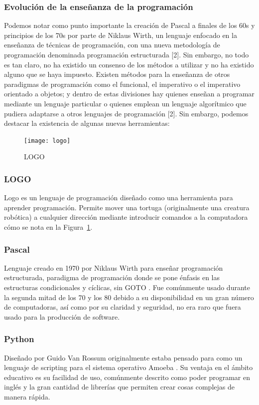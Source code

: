 \subsubsection{Evolución de la enseñanza de la programación}
Podemos notar como punto importante la creación de Pascal a finales de los 60s y principios de los 70s por parte de Niklaus Wirth, un lenguaje enfocado en la enseñanza de técnicas de programación, con una nueva metodología de programación denominada programación estructurada [2]. Sin embargo, no todo es tan claro, no ha existido un consenso de los métodos a utilizar y no ha existido alguno que se haya impuesto. 
Existen métodos para la enseñanza de otros paradigmas de programación como el funcional, el imperativo o el imperativo orientado a objetos; y dentro de estas divisiones hay quienes enseñan a programar mediante un lenguaje particular o quienes emplean un lenguaje algorítmico que pudiera adaptarse a otros lenguajes de programación [2].
Sin embargo, podemos destacar la existencia de algunas nuevas herramientas:

\begin{figure}[ht]
    \centering
    \texttt{[image: logo]}
     \caption{LOGO}
    \label{fig:logo_scrn}
\end{figure}

\subsubsection{LOGO}
Logo es un lenguaje de programación diseñado como una herramienta para aprender programación. 
Permite mover una tortuga (originalmente una creatura robótica) a cualquier dirección 
mediante introducir comandos a la computadora \cite{logo_history} cómo se nota en la Figura~\ref{fig:logo_scrn}.

\subsubsection{Pascal}
Lenguaje creado en 1970 por Niklaus Wirth para enseñar programación estructurada, 
paradigma de programación donde se pone énfasis en las 
estructuras condicionales y cíclicas, sin GOTO \cite{pascal_history}. 
Fue comúnmente usado durante la segunda mitad de los 70 y los 80 
debido a su disponibilidad en un gran número de computadoras, 
así como por su claridad y seguridad, no era raro que fuera usado para la 
producción de software.

\subsubsection{Python}
Diseñado por Guido Van Rossum originalmente estaba pensado 
para como un lenguaje de scripting para el sistema operativo Amoeba \cite{python_history}. 
Su ventaja en el ámbito educativo es su facilidad de uso, comúnmente descrito 
como poder programar en inglés y la gran cantidad de librerías que permiten 
crear cosas complejas de manera rápida.

